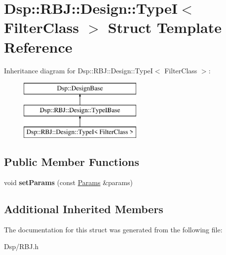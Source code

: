 \hypertarget{structDsp_1_1RBJ_1_1Design_1_1TypeI}{\section{Dsp\-:\-:R\-B\-J\-:\-:Design\-:\-:Type\-I$<$ Filter\-Class $>$ Struct Template Reference}
\label{structDsp_1_1RBJ_1_1Design_1_1TypeI}
}
Inheritance diagram for Dsp\-:\-:R\-B\-J\-:\-:Design\-:\-:Type\-I$<$ Filter\-Class $>$\-:\begin{figure}[H]
\begin{center}
\leavevmode
\includegraphics[height=3.000000cm]{structDsp_1_1RBJ_1_1Design_1_1TypeI}
\end{center}
\end{figure}
\subsection*{Public Member Functions}
\begin{DoxyCompactItemize}
\item 
\hypertarget{structDsp_1_1RBJ_1_1Design_1_1TypeI_a89a7fe1f65abd0a2ec4e4f51b2dd0858}{void {\bfseries set\-Params} (const \hyperlink{structDsp_1_1Params}{Params} \&params)}\label{structDsp_1_1RBJ_1_1Design_1_1TypeI_a89a7fe1f65abd0a2ec4e4f51b2dd0858}

\end{DoxyCompactItemize}
\subsection*{Additional Inherited Members}


The documentation for this struct was generated from the following file\-:\begin{DoxyCompactItemize}
\item 
Dsp/R\-B\-J.\-h\end{DoxyCompactItemize}
